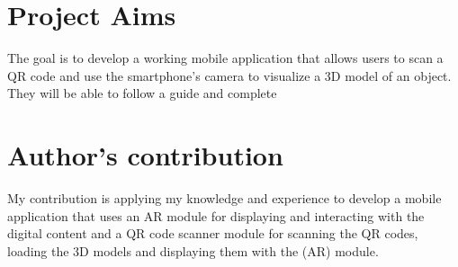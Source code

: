 \section{Project Aims}
The goal is to develop a working mobile application that allows users to scan a QR code and use the smartphone's camera to visualize a 3D model of an object. They will be able to follow a guide and complete
\section{Author's contribution}
My contribution is applying my knowledge and experience to develop a mobile application that uses an AR module for displaying and interacting with the digital content and a QR code scanner module for scanning the QR codes, loading the 3D models and displaying them with the (AR) module.





